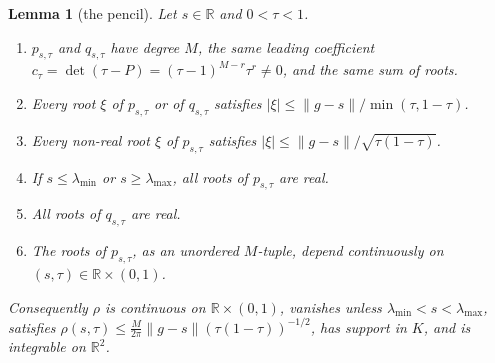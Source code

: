 \documentclass[11pt]{amsart}
\newtheorem{lemma}[theorem]{Lemma}
\theoremstyle{definition}
\theoremstyle{remark}
\numberwithin{equation}{section}
\newcommand{\R}{\mathbb{R}}
\newcommand{\lmin}{\lambda_{\min}}
\newcommand{\lmax}{\lambda_{\max}}
\begin{document}
\begin{lemma}[the pencil]\label{lem:pencil}
Let $s\in\R$ and $0<\tau<1$.
\begin{enumerate}
\item $p_{s,\tau}$ and $q_{s,\tau}$ have degree $M$, the same leading coefficient $c_\tau=\det(\tau-P)=(\tau-1)^{M-r}\tau^r\ne0$, and
the same sum of roots.
\item Every root $\xi$ of $p_{s,\tau}$ or of $q_{s,\tau}$ satisfies $|\xi|\le\|g-s\|/\min(\tau,1-\tau)$.
\item Every non-real root $\xi$ of $p_{s,\tau}$ satisfies $|\xi|\le\|g-s\|/\sqrt{\tau(1-\tau)}$.
\item If $s\le\lmin$ or $s\ge\lmax$, all roots of $p_{s,\tau}$ are real.
\item All roots of $q_{s,\tau}$ are real.
\item The roots of $p_{s,\tau}$, as an unordered $M$-tuple, depend continuously on $(s,\tau)\in\R\times(0,1)$.
\end{enumerate}
Consequently $\rho$ is continuous on $\R\times(0,1)$, vanishes unless $\lmin<s<\lmax$, satisfies
$\rho(s,\tau)\le\frac M{2\pi}\|g-s\|(\tau(1-\tau))^{-1/2}$, has support in $K$, and is integrable on $\R^2$.
\end{lemma}
\end{document}
